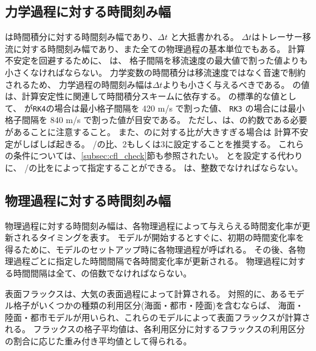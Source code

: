 \subsection{力学過程に対する時間刻み幅}

 は時間積分に対する時間刻み幅であり、$\Delta t$ と大抵書かれる。
$\Delta t$はトレーサー移流に対する時間刻み幅であり、また全ての物理過程の基本単位でもある。
計算不安定を回避するために、 は、
格子間隔を移流速度の最大値で割った値よりも小さくなければならない。
力学変数の時間積分は移流速度ではなく音速で制約されるため、
力学過程の時間刻み幅は$\Delta t$よりも小さく与えるべきである。
の値は、計算安定性に関連して時間積分スキームに依存する。
の標準的な値として、
が\verb|RK4|の場合は最小格子間隔を 420 m/s で割った値、
\verb|RK3| の場合には最小格子間隔を 840 m/s で割った値が目安である。
ただし、は、の約数である必要があることに注意すること。
また、のに対する比が大きすぎる場合は
計算不安定がしばしば起きる。
/の比、2もしくは3に設定することを推奨する。
これらの条件については、\ref{subsec:cfl_check}節も参照されたい。
とを設定する代わりに、
/の比をによって指定することができる。
は、整数でなければならない。

\subsection{物理過程に対する時間刻み幅}

物理過程に対する時間刻み幅は、各物理過程によって与えらえる時間変化率が更新されるタイミングを表す。
モデルが開始するとすぐに、初期の時間変化率を得るために、モデルのセットアップ時に各物理過程が呼ばれる。
その後、各物理過程ごとに指定した時間間隔で各時間変化率が更新される。
物理過程に対する時間間隔は全て、の倍数でなければならない。

表面フラックスは、大気の表面過程によって計算される。
対照的に、あるモデル格子がいくつかの種類の利用区分(海面・都市・陸面)を含むならば、
海面・陸面・都市モデルが用いられ、これらのモデルによって表面フラックスが計算される。
フラックスの格子平均値は、各利用区分に対するフラックスの利用区分の割合に応じた重み付き平均値として得られる。

